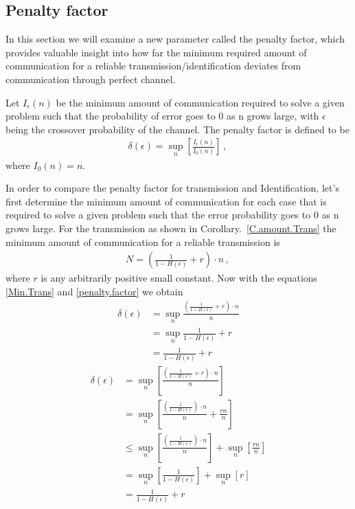 \subsection{Penalty factor}
In this section we will examine a new parameter called the penalty factor, which provides valuable insight into how far the minimum required amount of communication for a reliable transmission/identification deviates from communication through perfect channel.  
\begin{definition}
Let $I_\epsilon(n)$ be the minimum amount of communication required to solve a given problem such that the probability of error goes to 0 as n grows large, with $\epsilon$ being the crossover probability of the channel. The penalty factor is defined to be
\begin{align}
\label{penalty.factor}
    \delta(\epsilon)= \sup_{n} \left[ \frac{I_\epsilon(n)}{I_0(n)} \right] \,,\,
\end{align}
where $I_0(n)=n$.
\end{definition}
In order to compare the penalty factor for transmission and Identification, let's first determine the minimum amount of communication for each case that is required to solve a given problem such that the error probability goes to 0 as n grows large. For the transmission as shown in Corollary.~\ref{C.amount.Trans} the minimum amount of communication for a reliable transmission is 
\begin{align}
\label{Min.Trans}
    N=(\frac{1}{1-H(\epsilon)}+r)\cdot n \, ,\,
\end{align}
where $r$ is any arbitrarily positive small constant.
Now with the equations \eqref{Min.Trans} and \eqref{penalty.factor} we obtain 
\begin{align}
    \delta(\epsilon)&= \sup_{n} \frac{(\frac{1}{1-H(\epsilon)}+r)\cdot n}{n}
      \nonumber\\ &=\sup_{n}\frac{1}{1-H(\epsilon)}+r
    \nonumber\\
    &=\frac{1}{1-H(\epsilon)}+r
\end{align}
\begin{align}
    \delta(\epsilon) & = \sup_{n} \left[ \frac{\left( \frac{1}{1-H(\epsilon)} + r \right) \cdot n}{n} \right]
    \nonumber\\
    & = \sup_{n} \left[ \frac{\left( \frac{1}{1-H(\epsilon)} \right) \cdot n}{n} + \frac{rn}{n}\right]
    \nonumber\\
    & \leq \sup_{n} \left[ \frac{\left( \frac{1}{1-H(\epsilon)} \right) \cdot n}{n} \right] + \sup_n \left[ \frac{rn}{n} \right]
    \nonumber\\
    & = \sup_{n} \left[ \frac{1}{1-H(\epsilon)} \right] + \sup_n \left[ r \right]
    \nonumber\\
    & = \frac{1}{1-H(\epsilon)} + r
\end{align}
